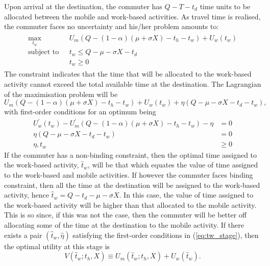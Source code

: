 \documentclass[12pt,a4paper,british]{article}
\begin{document}
Upon arrival at the destination, the commuter has $Q-T-t_{d}$ time units to be allocated between the mobile and work-based activities.
As travel time is realised, the commuter faces no uncertainty and his/her problem amounts to:
\begin{align}
\begin{split}
\max_{t_{w}} \quad & U_{m}\left(Q - \left(1 - \alpha\right) \left(\mu + \sigma X\right) - t_{h} - t_{w}\right) + U_{w}\left(t_{w}\right) \\
\mbox{subject to } \,\, & t_{w} \leq Q-\mu-\sigma X-t_{d} \\
 & t_w \geq 0
\end{split}
\label{eq:secondStageProb}
\end{align}
The constraint indicates that the time that will be allocated to the work-based activity cannot exceed the total available time at the
destination. The Lagrangian of the maximisation problem will be%
\begin{equation*}
U_{m}\left(Q-\left(1-\alpha\right)\left(\mu+\sigma X\right)-t_{h}-t_{w}\right)+U_{w}\left(t_{w}\right)+\eta\left(Q-\mu-\sigma X-t_{d}-t_{w}\right),
\end{equation*}
with first-order conditions for an optimum being%
\begin{subequations}
\label{eq:tw_stage}
\begin{align}
U_{w}^{\prime}\left(t_{w}\right)-U_{m}^{\prime}\left(Q-\left(1-\alpha\right)\left(\mu+\sigma X\right)-t_{h}-t_{w}\right)-\eta & =0
\label{eq:stage2_wrt_tw}\\
\eta\left(Q-\mu-\sigma X-t_{d}-t_{w}\right) & =0\label{eq:stage2_compl}\\
\eta,t_{w} & \geq 0
\label{eq:stage2_nonnegative}
\end{align}
\end{subequations}
If the commuter has a non-binding constraint, then the optimal time assigned to the work-based activity, $\hat{t}_{w}$, will be that which equates the value of time assigned to the work-based and mobile activities. If however the commuter faces binding constraint, then all the time at the destination will be assigned to the work-based activity, hence $\hat{t}_{w}=Q-t_{d}-\mu-\sigma X$. In this case, the value of time assigned to the work-based activity will be higher than that allocated to the mobile activity. This is so since, if this was not the case, then the commuter will be better off allocating some of the time at the destination to the mobile activity. If there exists a pair $\left(\hat{t}_{w},\hat{\eta}\right)$ satisfying the first-order conditions in (\ref{eq:tw_stage}), then the optimal utility at this stage is\begin{equation*}
V\left(\hat{t}_{w};t_{h}, X\right)\equiv U_{m}\left(\hat{t}_{w}; t_{h}, X\right) + U_{w}\left(\hat{t}_{w}\right).
\end{equation*}
\end{document}
